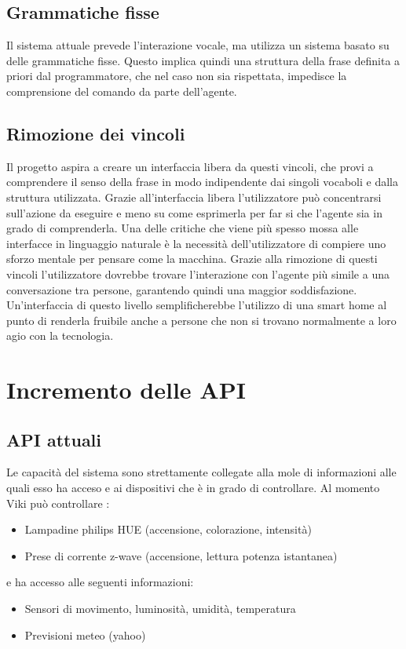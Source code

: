 \documentclass[twoside]{supsistudent}
\begin{document}
\subsection{Grammatiche fisse}
Il sistema attuale prevede l'interazione vocale, ma utilizza un sistema basato su delle grammatiche fisse. Questo implica quindi una struttura della frase definita a priori dal programmatore, che nel caso non sia rispettata, impedisce la comprensione del comando da parte dell'agente.
\subsection{Rimozione dei vincoli}
Il progetto aspira a creare un interfaccia libera da questi vincoli, che provi a comprendere il senso della frase in modo indipendente dai singoli vocaboli e dalla struttura utilizzata.
Grazie all'interfaccia libera l'utilizzatore può concentrarsi sull'azione da eseguire e meno su come esprimerla per far si che l'agente sia in grado di comprenderla. Una delle critiche che viene più spesso mossa alle interfacce in linguaggio naturale è la necessità dell'utilizzatore di compiere uno sforzo mentale per pensare come la macchina.
Grazie alla rimozione di questi vincoli l'utilizzatore dovrebbe trovare l'interazione con l'agente più simile a una conversazione tra persone, garantendo quindi una maggior soddisfazione.
Un'interfaccia di questo livello semplificherebbe l'utilizzo di una smart home al punto di renderla fruibile anche a persone che non si trovano normalmente a loro agio con la tecnologia.
\section{Incremento delle API}
\subsection{API attuali}
Le capacità del sistema sono strettamente collegate alla mole di informazioni alle quali esso ha acceso e ai dispositivi che è in grado di controllare. 
Al momento Viki può controllare :
\begin{itemize}
  \item Lampadine philips HUE (accensione, colorazione, intensità)
  \item Prese di corrente z-wave (accensione, lettura potenza istantanea)
\end{itemize}
e ha accesso alle seguenti informazioni:
\begin{itemize}
  \item Sensori di movimento, luminosità, umidità, temperatura
  \item Previsioni meteo (yahoo)
\end{itemize}
\end{document}
